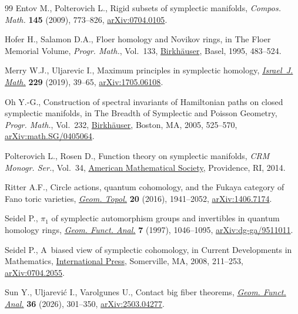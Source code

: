 \documentclass[pdftex]{sigma}
\numberwithin{equation}{section}
\theoremstyle{definition}
\begin{document}
\begin{thebibliography}{99}
Entov M., Polterovich L., Rigid subsets of symplectic manifolds,
\textit{Compos. Math.}
 \textbf{145} (2009), 773--826,
 \href{http://arxiv.org/abs/0704.0105}{arXiv:0704.0105}.

Hofer H., Salamon D.A., Floer homology and {N}ovikov rings, in The {F}loer
 Memorial Volume, \textit{Progr. Math.}, Vol.~133,
 \href{https://doi.org/10.1007/978-3-0348-9217-9_20}{Birkh\"auser}, Basel,
 1995, 483--524.

Merry W.J., Uljarevic I., Maximum principles in symplectic homology,
 \href{https://doi.org/10.1007/s11856-018-1792-z}{\textit{Israel~J. Math.}}
 \textbf{229} (2019), 39--65,
 \href{http://arxiv.org/abs/1705.06108}{arXiv:1705.06108}.

Oh Y.-G., Construction of spectral invariants of {H}amiltonian paths on closed
 symplectic manifolds, in The Breadth of Symplectic and {P}oisson Geometry,
 \textit{Progr. Math.}, Vol.~232,
 \href{https://doi.org/10.1007/0-8176-4419-9_18}{Birkh\"auser}, Boston, MA,
 2005, 525--570,
 \href{http://arxiv.org/abs/math.SG/0405064}{arXiv:math.SG/0405064}.

Polterovich L., Rosen D., Function theory on symplectic manifolds,
 \textit{{CRM} Monogr. Ser.}, Vol.~34,
 \href{https://doi.org/10.1090/crmm/034}{American Mathematical Society},
 Providence, RI, 2014.

Ritter A.F., Circle actions, quantum cohomology, and the {F}ukaya category of
 {F}ano toric varieties,
 \href{https://doi.org/10.2140/gt.2016.20.1941}{\textit{Geom. Topol.}}
 \textbf{20} (2016), 1941--2052,
 \href{http://arxiv.org/abs/1406.7174}{arXiv:1406.7174}.

Seidel P., {$\pi_1$} of symplectic automorphism groups and invertibles in
 quantum homology rings,
 \href{https://doi.org/10.1007/s000390050037}{\textit{Geom. Funct. Anal.}}
 \textbf{7} (1997), 1046--1095,
 \href{http://arxiv.org/abs/dg-ga/9511011}{arXiv:dg-ga/9511011}.

Seidel P., A~biased view of symplectic cohomology, in Current Developments in
 Mathematics,
 \href{https://doi.org/10.4310/CDM.2006.v2006.n1.a4}{International Press},
 Somerville, MA, 2008, 211--253,
 \href{http://arxiv.org/abs/0704.2055}{arXiv:0704.2055}.

Sun Y., Uljarevi\'c I., Varolgunes U., Contact big fiber theorems,
 \href{https://doi.org/10.1007/s00039-026-00734-4}{\textit{Geom. Funct.
 Anal.}} \textbf{36} (2026), 301--350,
 \href{http://arxiv.org/abs/2503.04277}{arXiv:2503.04277}.


\end{thebibliography}
\end{document}
